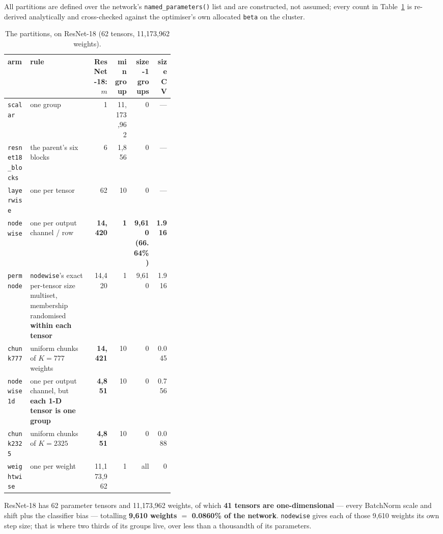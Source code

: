 \documentclass[10pt,letterpaper]{article}
\newcommand{\arm}[1]{\texttt{#1}}
\begin{document}
All partitions are defined over the network's \texttt{named\_parameters()} list and are
constructed, not assumed; every count in Table~\ref{tab:partitions} is re-derived analytically
and cross-checked against the optimiser's own allocated \texttt{beta} on the cluster.

\begin{table}[htbp]
\centering
\footnotesize
\setlength{\tabcolsep}{4pt}
\caption{The partitions, on ResNet-18 (62 tensors, 11{,}173{,}962 weights).}
\label{tab:partitions}
\begin{tabular}{@{}l p{0.38\linewidth} r r r r@{}}
\toprule
arm & rule & ResNet-18: $m$ & min group & size-1 groups & size CV \\
\midrule
\arm{scalar}           & one group & 1 & 11{,}173{,}962 & 0 & --- \\
\arm{resnet18\_blocks} & the parent's six blocks & 6 & 1{,}856 & 0 & --- \\
\arm{layerwise}        & one per tensor & 62 & 10 & 0 & --- \\
\arm{nodewise}         & one per output channel / row & \textbf{14{,}420} & \textbf{1} &
                         \textbf{9{,}610 (66.64\%)} & \textbf{1.916} \\
\arm{permnode}         & \arm{nodewise}'s exact per-tensor size multiset, membership
                         randomised \textbf{within each tensor} & 14{,}420 & 1 & 9{,}610 &
                         1.916 \\
\arm{chunk777}         & uniform chunks of $K = 777$ weights & \textbf{14{,}421} & 10 & 0 &
                         0.045 \\
\arm{nodewise1d}       & one per output channel, but \textbf{each 1-D tensor is one group} &
                         \textbf{4{,}851} & 10 & 0 & 0.756 \\
\arm{chunk2325}        & uniform chunks of $K = 2325$ & \textbf{4{,}851} & 10 & 0 & 0.088 \\
\arm{weightwise}       & one per weight & 11{,}173{,}962 & 1 & all & 0 \\
\bottomrule
\end{tabular}
\end{table}

ResNet-18 has 62 parameter tensors and 11{,}173{,}962 weights, of which \textbf{41 tensors are
one-dimensional} --- every BatchNorm scale and shift plus the classifier bias --- totalling
\textbf{9{,}610 weights $=$ 0.0860\% of the network}. \arm{nodewise} gives each of those 9{,}610
weights its own step size; that is where two thirds of its groups live, over less than a
thousandth of its parameters.
\end{document}
